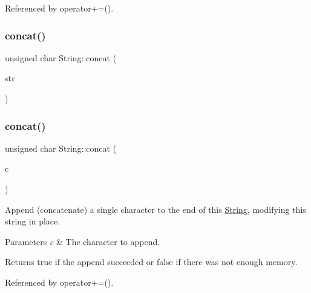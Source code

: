 Referenced by operator+=().

\mbox{\label{class_string_a09dd174078f7d0b1552b249949cfd96c}} 
\subsubsection{\texorpdfstring{concat()}{concat()}\hspace{0.1cm}{\footnotesize\ttfamily [3/12]}}
{\footnotesize\ttfamily unsigned char String\+::concat (\begin{DoxyParamCaption}\item[{const \+\_\+\+\_\+\+Flash\+String\+Helper $\ast$}]{str }\end{DoxyParamCaption})}

\mbox{\label{class_string_a5f3e286a1a7b65a154e3e3dd19d4b707}} 
\subsubsection{\texorpdfstring{concat()}{concat()}\hspace{0.1cm}{\footnotesize\ttfamily [4/12]}}
{\footnotesize\ttfamily unsigned char String\+::concat (\begin{DoxyParamCaption}\item[{char}]{c }\end{DoxyParamCaption})}



Append (concatenate) a single character to the end of this \hyperlink{class_string}{String}, modifying this string in place. 


\begin{DoxyParams}{Parameters}
{\em c} & The character to append.\\
\hline
\end{DoxyParams}
\begin{DoxyReturn}{Returns}
true if the append succeeded or false if there was not enough memory. 
\end{DoxyReturn}


Referenced by operator+=().

\mbox{\label{class_string_a1c02b2de34a3245d16c5430951789f7d}} 
